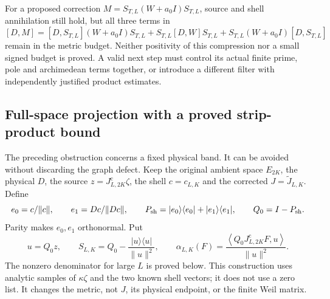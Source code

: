 \documentclass[11pt]{article}
\theoremstyle{remark}
\newcommand{\ip}[2]{\left\langle #1,#2\right\rangle}
\newcommand{\Jc}{J^{\mathrm c}}
\newcommand{\Jr}{\widetilde J}
\begin{document}
For a proposed correction $M=S_{T,L}(W+a_0I)S_{T,L}$, source and shell
annihilation still hold, but all three terms in
\[
 [D,M]=[D,S_{T,L}](W+a_0I)S_{T,L}
       +S_{T,L}[D,W]S_{T,L}
       +S_{T,L}(W+a_0I)[D,S_{T,L}]
\]
remain in the metric budget. Neither positivity of this compression nor
a small signed budget is proved. A valid next step must control its
actual finite prime, pole and archimedean terms together, or introduce
a different filter with independently justified product estimates.

\subsection*{Full-space projection with a proved strip-product bound}
The preceding obstruction concerns a fixed physical band. It can be
avoided without discarding the graph defect. Keep the original ambient
space $E_{2K}$, the physical $D$, the source $z=\Jc_{L,2K}\zeta$,
the shell $c=c_{L,K}$ and the corrected $J=\Jr_{L,K}$. Define
\[
 e_0=c/\|c\|,\qquad e_1=Dc/\|Dc\|,\qquad
 P_{\rm sh}=|e_0\rangle\langle e_0|+|e_1\rangle\langle e_1|,
 \qquad Q_0=I-P_{\rm sh}.
\]
Parity makes $e_0,e_1$ orthonormal. Put
\begin{equation}\label{eq:v18-full-projection}
 u=Q_0z,\qquad
 S_{L,K}=Q_0-\frac{|u\rangle\langle u|}{\|u\|^2},\qquad
 \alpha_{L,K}(F)=\frac{\ip{Q_0\Jc_{L,2K}F}{u}}{\|u\|^2}.
\end{equation}
The nonzero denominator for large $L$ is proved below. This construction
uses analytic samples of $\kappa\zeta$ and the two known shell vectors;
it does not use a zero list. It changes the metric, not $J$, its physical
endpoint, or the finite Weil matrix.
\end{document}
